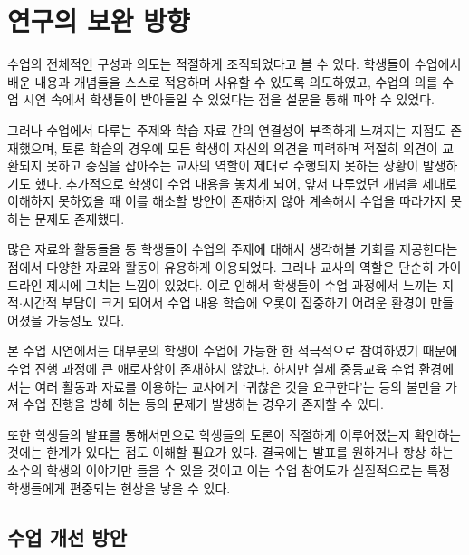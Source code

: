 \documentclass[10pt, a4paper, chapter]{oblivoir}
\begin{document}



\chapter{연구의 보완 방향}
    수업의 전체적인 구성과 의도는 적절하게 조직되었다고 볼 수 있다. 
    학생들이 수업에서 배운 내용과 개념들을 스스로 적용하며 사유할 수 있도록 의도하였고, 수업의 의를 수업 시연 속에서 학생들이 받아들일 수 있었다는 점을 설문을 통해 파악 수 있었다. 

    그러나 수업에서 다루는 주제와 학습 자료 간의 연결성이 부족하게 느껴지는 지점도 존재했으며,
    토론 학습의 경우에 모든 학생이 자신의 의견을 피력하며 적절히 의견이 교환되지 못하고 
    중심을 잡아주는 교사의 역할이 제대로 수행되지 못하는 상황이 발생하기도 했다. 추가적으로
    학생이 수업 내용을 놓치게 되어, 앞서 다루었던 개념을 제대로 이해하지 못하였을 때 
    이를 해소할 방안이 존재하지 않아 계속해서 수업을 따라가지 못하는 문제도 존재했다. 

    많은 자료와 활동들을 통 학생들이 수업의 주제에 대해서 생각해볼 기회를 제공한다는 점에서
    다양한 자료와 활동이 유용하게 이용되었다. 그러나 교사의 역할은 단순히 가이드라인 제시에 
    그치는 느낌이 있었다. 이로 인해서 학생들이 수업 과정에서 느끼는 지적$\cdot$시간적 부담이
    크게 되어서 수업 내용 학습에 오롯이 집중하기 어려운 환경이 만들어졌을 가능성도 있다. \newline

    \noindent
    본 수업 시연에서는 대부분의 학생이 수업에 가능한 한 적극적으로 참여하였기 때문에 수업 진행 과정에
    큰 애로사항이 존재하지 않았다. 하지만 실제 중등교육 수업 환경에서는 여러 활동과 자료를 이용하는 
    교사에게 `귀찮은 것을 요구한다'는 등의 불만을 가져 수업 진행을 방해 하는 등의 문제가 발생하는 
    경우가 존재할 수 있다. 

    또한 학생들의 발표를 통해서만으로 학생들의 토론이 적절하게 이루어졌는지 확인하는 것에는 한계가 있다는 점도 이해할 필요가 있다. 
    결국에는 발표를 원하거나 항상 하는 소수의 학생의 이야기만 들을 수 있을 것이고 이는 수업 참여도가
    실질적으로는 특정 학생들에게 편중되는 현상을 낳을 수 있다.

    \section{수업 개선 방안}
\end{document}
